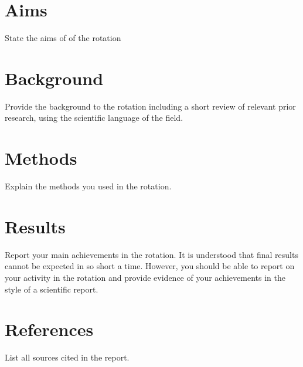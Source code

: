 \documentclass[paper=a4wide, fontsize=12pt]{scrartcl}	 %
\begin{document}
\section*{Aims}

State the aims of of the rotation 

\section*{Background}

Provide the background to the rotation including a short review of relevant prior research, using the scientific language of the field.

\section*{Methods}

Explain the methods you used in the rotation.


\section*{Results}

Report your main achievements in the rotation. It is understood that final results cannot be expected in so short a time. However, you should be able to report on your activity in the rotation and provide evidence of your achievements in the style of a scientific report. 


\section*{References}

List all sources cited in the report.
\end{document}
